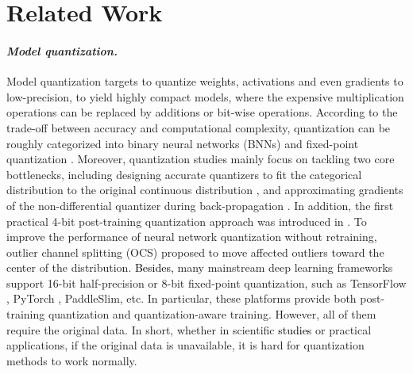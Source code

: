 \documentclass[runningheads]{llncs}
\def\new{\textcolor{black}}
\begin{document}
\section{Related Work}
\label{Related Work}

\paragraph{\emph{\textbf{Model quantization.}}}
Model quantization targets to quantize weights, activations and even gradients to low-precision, to yield highly compact models, where the expensive multiplication operations can be replaced by additions or bit-wise operations. According to the trade-off between accuracy and computational complexity, quantization can be roughly categorized into binary neural networks (BNNs) \cite{hubara2016binarized,rastegari2016xnor,zhuang2019structured} and fixed-point quantization \cite{zhou2016dorefa,esser2019learned,zhuang2018towards}. Moreover, quantization studies mainly focus on tackling two core bottlenecks, including designing accurate quantizers to fit the categorical distribution to the original continuous distribution \cite{Cai_2017_CVPR,jung2019learning,zhang2018lq}, and approximating gradients of the non-differential quantizer during back-propagation \cite{Yang_2019_CVPR,louizos2019relaxed,zhuang2020training}.
In addition, the first practical 4-bit post-training quantization approach was introduced in \cite{banner2019post}. 
To improve the performance of neural network quantization without retraining, outlier channel splitting (OCS) \cite{zhao2019improving} proposed to move affected outliers toward the center of the distribution. 
\new{Besides,} many mainstream deep learning frameworks support 16-bit half-precision or 8-bit fixed-point quantization, such as TensorFlow \cite{abadi2016tensorflow}, PyTorch \cite{paszke2017pytorch}, PaddleSlim, etc.
In particular, these platforms provide both post-training quantization and quantization-aware training.
However, all of them require the original data.
In short, whether in scientific \new{studies} or practical applications, if the original data is unavailable, it is hard for quantization methods to work normally.
\end{document}

